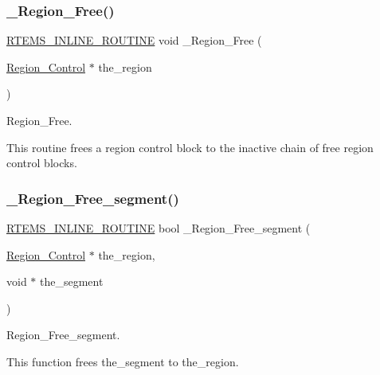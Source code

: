 \subsubsection{\texorpdfstring{\_Region\_Free()}{\_Region\_Free()}}
{\footnotesize\ttfamily \mbox{\hyperlink{group__RTEMSScoreBaseDefs_gac216239df231d5dbd15e3520b0b9313f}{R\+T\+E\+M\+S\+\_\+\+I\+N\+L\+I\+N\+E\+\_\+\+R\+O\+U\+T\+I\+NE}} void \+\_\+\+Region\+\_\+\+Free (\begin{DoxyParamCaption}\item[{\mbox{\hyperlink{structRegion__Control}{Region\+\_\+\+Control}} $\ast$}]{the\+\_\+region }\end{DoxyParamCaption})}



Region\+\_\+\+Free. 

This routine frees a region control block to the inactive chain of free region control blocks. \mbox{\label{group__ClassicRegionImpl_gac72484c748cac55eb42eccaa574dd6a7}} 
\subsubsection{\texorpdfstring{\_Region\_Free\_segment()}{\_Region\_Free\_segment()}}
{\footnotesize\ttfamily \mbox{\hyperlink{group__RTEMSScoreBaseDefs_gac216239df231d5dbd15e3520b0b9313f}{R\+T\+E\+M\+S\+\_\+\+I\+N\+L\+I\+N\+E\+\_\+\+R\+O\+U\+T\+I\+NE}} bool \+\_\+\+Region\+\_\+\+Free\+\_\+segment (\begin{DoxyParamCaption}\item[{\mbox{\hyperlink{structRegion__Control}{Region\+\_\+\+Control}} $\ast$}]{the\+\_\+region,  }\item[{void $\ast$}]{the\+\_\+segment }\end{DoxyParamCaption})}



Region\+\_\+\+Free\+\_\+segment. 

This function frees the\+\_\+segment to the\+\_\+region. \mbox{\label{group__ClassicRegionImpl_ga3cf94767384ce29609efbb70c01f8531}} 
